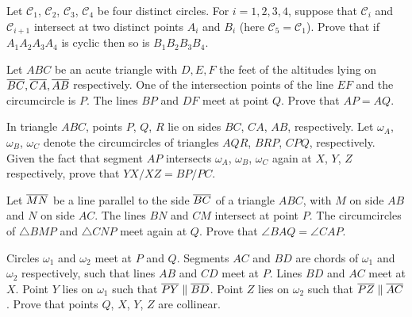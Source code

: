 \documentclass[11pt]{scrartcl}
\begin{document}
\begin{problem}
	[Folklore]
	Let $\mathcal C_1$, $\mathcal C_2$, $\mathcal C_3$, $\mathcal C_4$
	be four distinct circles.
	For $i=1,2,3,4$, suppose that $\mathcal C_i$ and $\mathcal C_{i+1}$
	intersect at two distinct points $A_i$ and $B_i$
	(here $\mathcal C_5 = \mathcal C_1$).
	Prove that if $A_1A_2A_3A_4$ is cyclic then so is $B_1B_2B_3B_4$.
\end{problem}
\begin{problem}
	[Shortlist 2010/G1]
	Let $ABC$ be an acute triangle with $D, E, F$ the feet of the altitudes lying on $\overline{BC}, \overline{CA}, \overline{AB}$ respectively.
	One of the intersection points of the line $EF$ and the circumcircle is $P$.
	The lines $BP$ and $DF$ meet at point $Q$. Prove that $AP = AQ$.
\end{problem}
\begin{problem}
	[USAMO 2013/1] In triangle $ABC$, points $P$, $Q$, $R$ lie on sides $BC$, $CA$, $AB$, respectively.
	Let $\omega_A$, $\omega_B$, $\omega_C$ denote the circumcircles of triangles $AQR$, $BRP$, $CPQ$, respectively. 
	Given the fact that segment $AP$ intersects $\omega_A$, $\omega_B$, $\omega_C$ again at $X$, $Y$, $Z$ respectively,
	prove that $YX/XZ=BP/PC$.
\end{problem}
\begin{problem}
	[Balkan 2009] Let $\overline{MN}$ be a line parallel to the side $\overline{BC}$ of a triangle $ABC$,
	with $M$ on side $AB$ and $N$ on side $AC$.
	The lines $BN$ and $CM$ intersect at point $P$.
	The circumcircles of $\triangle BMP$ and $\triangle CNP$ meet again at $Q$.
	Prove that $\angle BAQ = \angle CAP$.
\end{problem}
\begin{problem}
	 Circles $\omega_1$ and $\omega_2$ meet at $P$ and $Q$.
	Segments $AC$ and $BD$ are chords of $\omega_1$ and $\omega_2$ respectively, such that lines $AB$ and $CD$ meet at $P$.
	Lines $BD$ and $AC$ meet at $X$.
	Point $Y$ lies on $\omega_1$ such that $\overline{PY} \parallel \overline{BD}$.
	Point $Z$ lies on $\omega_2$ such that $\overline{PZ} \parallel \overline{AC}$.
	Prove that points $Q$, $X$, $Y$, $Z$ are collinear.
\end{problem}
\end{document}
